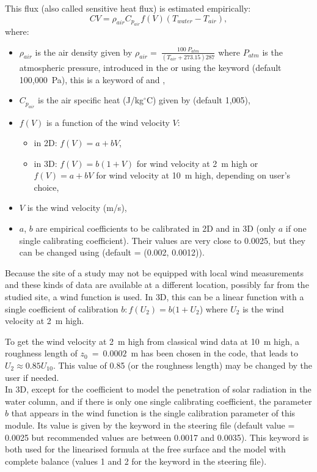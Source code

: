 This flux (also called sensitive heat flux) is estimated empirically:
\begin{equation*}
CV=\rho_{air}C_{p_{air}}f(V)\left(T_{water}-T_{air} \right),
\end{equation*}
where:
\begin{itemize}
  \item $\rho_{air}$ is the air density given by
${\rho }_{air}=\ \frac{100\ P_{atm}}{\left(T_{air}+273.15\right)287}$
where $P_{atm}$ is the atmospheric pressure,
introduced in the  or using the keyword
 (default 100,000~Pa),
this is a keyword of  and ,
\item $C_{p_{air}}$ is the air specific heat (J/kg${}^\circ$C)
  given by  (default 1,005),
\item $f(V)$ is a function of the wind velocity $V$:
  \begin{itemize}
  \item in 2D: $f(V) = a+bV$,
  \item in 3D: $f(V) = b(1+V)$ for wind velocity at 2~m high
    or $f(V) = a+bV$ for wind velocity at 10~m high,
    depending on user's choice,
  \end{itemize}
\item $V$ is the wind velocity (m/s),
\item $a$, $b$ are empirical coefficients to be calibrated in 2D and in 3D (only $a$ if one single calibrating coefficient).
Their values are very close to 0.0025, but they can be changed
using  (default = (0.002, 0.0012)).
\end{itemize}

Because the site of a study may not be equipped with local wind measurements
and these kinds of data are available at a different location, possibly far
from the studied site, a wind function is used.
In 3D, this can be a linear function with
a single coefficient of calibration $b:f(U_{2}) = b(1+U_{2}$) where $U_{2}$ is
the wind velocity at 2~m high.

To get the wind velocity at 2~m high from classical wind data at 10~m high, a
roughness length of ${z}_{0}~=~0.0002$~m has been chosen in the code,
that leads to $U_{2} \approx 0.85 U_{10}$. This value
of 0.85 (or the roughness length) may be changed by the user if needed.\\

In 3D, except for the coefficient to model the penetration of solar radiation in the
water column,
and if there is only one single calibrating coefficient,
the parameter $b$ that appears in the wind function is the
single calibration parameter of this module. Its value is given by the keyword
in the \waqtel steering file (default
value = 0.0025 but recommended values are between 0.0017 and 0.0035). This
keyword is both used for the linearised formula at the free surface and the
model with complete balance (values 1 and 2 for the keyword
 in the \waqtel steering file).

